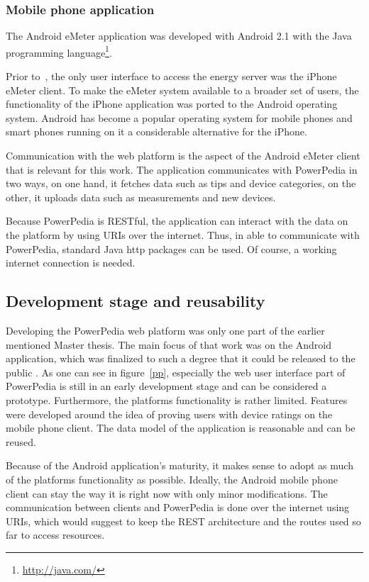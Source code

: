 \subsubsection{Mobile phone application}
The Android eMeter application was developed with Android 2.1 with the Java programming language\footnote{\url{http://java.com/}}.

Prior to~\cite{merklepp}, the only user interface to access the energy server was the iPhone eMeter client. To make the eMeter system available to a broader set of users, the functionality of the iPhone application was ported to the Android operating system. Android has become a popular operating system for mobile phones and smart phones running on it a considerable alternative for the iPhone.

Communication with the web platform is the aspect of the Android eMeter client that is relevant for this work. The application communicates with PowerPedia in two ways, on one hand, it fetches data such as tips and device categories, on the other, it uploads data such as measurements and new devices.  

Because PowerPedia is RESTful, the application can interact with the data on the platform by using URIs over the internet. Thus, in able to communicate with PowerPedia, standard Java http packages can be used. Of course, a working internet connection is needed.

\subsection{Development stage and reusability}

Developing the PowerPedia web platform was only one part of the earlier mentioned Master thesis. The main focus of that work was on the Android application, which was finalized to such a degree that it could be released to the public . As one can see in figure~\ref{pp}, especially the web user interface part of PowerPedia is still in an early development stage and can be considered a prototype. Furthermore, the platforms functionality is rather limited. Features were developed around the idea of proving users with device ratings on the mobile phone client. The data model of the application is reasonable and can be reused. 

Because of the Android application's maturity, it makes sense to adopt as much of the platforms functionality as possible. Ideally, the Android mobile phone client can stay the way it is right now with only minor modifications. The communication between clients and PowerPedia is done over the internet using URIs, which would suggest to keep the REST architecture and the routes used so far to access resources.

